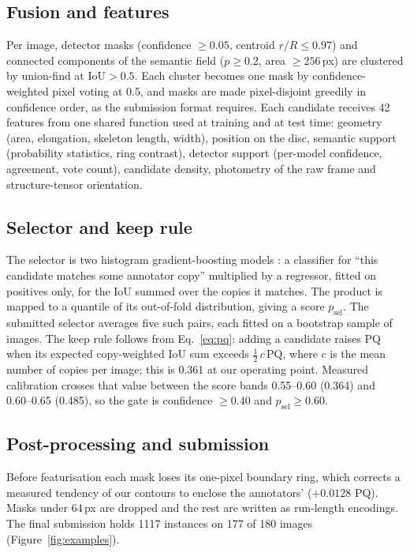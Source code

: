 \documentclass[sigconf]{acmart}
\begin{document}
\subsection{Fusion and features}
Per image, detector masks (confidence $\geq 0.05$, centroid $r/R\leq 0.97$) and connected components of the semantic field ($p\geq 0.2$, area $\geq 256$\,px) are clustered by union-find at $\mathrm{IoU}>0.5$. Each cluster becomes one mask by confidence-weighted pixel voting at 0.5, and masks are made pixel-disjoint greedily in confidence order, as the submission format requires. Each candidate receives 42 features from one shared function used at training and at test time: geometry (area, elongation, skeleton length, width), position on the disc, semantic support (probability statistics, ring contrast), detector support (per-model confidence, agreement, vote count), candidate density, photometry of the raw frame and structure-tensor orientation.

\subsection{Selector and keep rule}\label{sec:selector}
The selector is two histogram gradient-boosting models \cite{pedregosa2011sklearn}: a classifier for ``this candidate matches some annotator copy'' multiplied by a regressor, fitted on positives only, for the IoU summed over the copies it matches. The product is mapped to a quantile of its out-of-fold distribution, giving a score $p_\mathrm{sel}$. The submitted selector averages five such pairs, each fitted on a bootstrap sample of images. The keep rule follows from Eq.~\ref{eq:pq}: adding a candidate raises PQ when its expected copy-weighted IoU sum exceeds $\tfrac12\,c\,\mathrm{PQ}$, where $c$ is the mean number of copies per image; this is 0.361 at our operating point. Measured calibration crosses that value between the score bands 0.55--0.60 (0.364) and 0.60--0.65 (0.485), so the gate is confidence $\geq 0.40$ and $p_\mathrm{sel}\geq 0.60$.

\subsection{Post-processing and submission}
Before featurisation each mask loses its one-pixel boundary ring, which corrects a measured tendency of our contours to enclose the annotators' ($+0.0128$ PQ). Masks under 64\,px are dropped and the rest are written as run-length encodings. The final submission holds 1117 instances on 177 of 180 images (Figure~\ref{fig:examples}).
\end{document}

